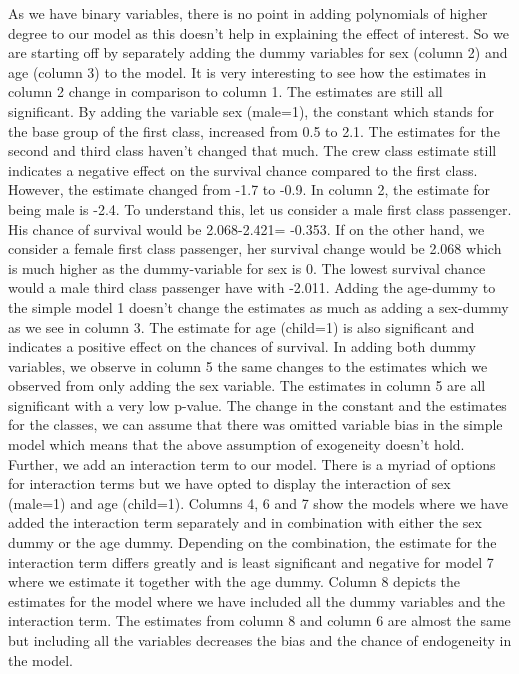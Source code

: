 \documentclass[
]{article}
\begin{document}
As we have binary variables, there is no point in adding polynomials of
higher degree to our model as this doesn't help in explaining the effect
of interest. So we are starting off by separately adding the dummy
variables for sex (column 2) and age (column 3) to the model. It is very
interesting to see how the estimates in column 2 change in comparison to
column 1. The estimates are still all significant. By adding the
variable sex (male=1), the constant which stands for the base group of
the first class, increased from 0.5 to 2.1. The estimates for the second
and third class haven't changed that much. The crew class estimate still
indicates a negative effect on the survival chance compared to the first
class. However, the estimate changed from -1.7 to -0.9. In column 2, the
estimate for being male is -2.4. To understand this, let us consider a
male first class passenger. His chance of survival would be 2.068-2.421=
-0.353. If on the other hand, we consider a female first class
passenger, her survival change would be 2.068 which is much higher as
the dummy-variable for sex is 0. The lowest survival chance would a male
third class passenger have with -2.011. Adding the age-dummy to the
simple model 1 doesn't change the estimates as much as adding a
sex-dummy as we see in column 3. The estimate for age (child=1) is also
significant and indicates a positive effect on the chances of survival.
In adding both dummy variables, we observe in column 5 the same changes
to the estimates which we observed from only adding the sex variable.
The estimates in column 5 are all significant with a very low p-value.
The change in the constant and the estimates for the classes, we can
assume that there was omitted variable bias in the simple model which
means that the above assumption of exogeneity doesn't hold. Further, we
add an interaction term to our model. There is a myriad of options for
interaction terms but we have opted to display the interaction of sex
(male=1) and age (child=1). Columns 4, 6 and 7 show the models where we
have added the interaction term separately and in combination with
either the sex dummy or the age dummy. Depending on the combination, the
estimate for the interaction term differs greatly and is least
significant and negative for model 7 where we estimate it together with
the age dummy. Column 8 depicts the estimates for the model where we
have included all the dummy variables and the interaction term. The
estimates from column 8 and column 6 are almost the same but including
all the variables decreases the bias and the chance of endogeneity in
the model.
\end{document}
